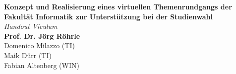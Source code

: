 \documentclass[a0,portrait]{a0poster}
\begin{document}


\begin{minipage}[b]{1\linewidth}
\veryHuge \color{NavyBlue} \textbf{Konzept und Realisierung eines virtuellen Themenrundgangs der Fakultät Informatik zur Unterstützung bei der Studienwahl} \color{Black}\\ %
\Huge\textit{Handout Viculum}\\[2cm] %
\huge \textbf{Prof. Dr. Jörg Röhrle}\\[0.5cm] %
\huge Domenico Milazzo (TI)\\[0.3cm] %
\huge Maik Dürr (TI)\\[0.3cm] %
\huge Fabian Altenberg (WIN)\\[0.3cm] %

\end{minipage}
%

\vspace{1cm} %

\end{document}
